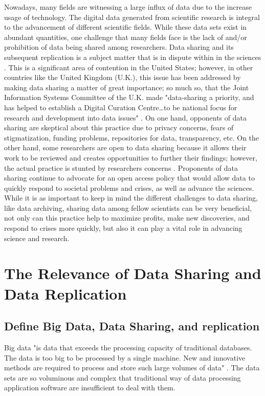 \documentclass[sigconf]{acmart}
\begin{document}
Nowadays, many fields are witnessing a large influx of data due to the increase usage of technology. The digital data generated from scientific research is integral to the advancement of different scientific fields. While these data sets exist in abundant quantities, one challenge that many fields face is the lack of and/or prohibition of data being shared among researchers. Data sharing and its subsequent replication is a subject matter that is in dispute within in the sciences \cite{leetaru2016}. This is a significant area of contention in the United States; however, in other countries like the United Kingdom (U.K.), this issue has been addressed by making data sharing a matter of great importance; so much so, that the Joint Information Systems Committee of the U.K. made "data-sharing a priority, and has helped to establish a Digital Curation Centre…to be national focus for research and development into data issues" \cite{pryor2009skilling}. On one hand, opponents of data sharing are skeptical about this practice due to privacy concerns, fears of stigmatization, funding problems, repositories for data, transparency, etc. On the other hand, some researchers are open to data sharing because it allows their work to be reviewed and creates opportunities to further their findings; however, the actual practice is stunted by researchers concerns \cite{nelson2009empty}. Proponents of data sharing continue to advocate for an open access policy that would allow data to quickly respond to societal problems and crises, as well as advance the sciences. While it is as important to keep in mind the different challenges to data sharing, like data archiving, sharing data among fellow scientists can be very beneficial, not only can this practice help to maximize profits, make new discoveries, and respond to crises more quickly, but also it can play a vital role in advancing science and research.


\section{The Relevance of Data Sharing and Data Replication }



\subsection{ Define Big Data, Data Sharing, and replication}


Big data "is data that exceeds the processing capacity of traditional databases. The data is too big to be processed by a single machine. New and innovative methods are required to process and store such large volumes of data" \cite{gupta2014big}. The data sets are so voluminous and complex that traditional way of data processing application software are insufficient to deal with them. 
\end{document}
